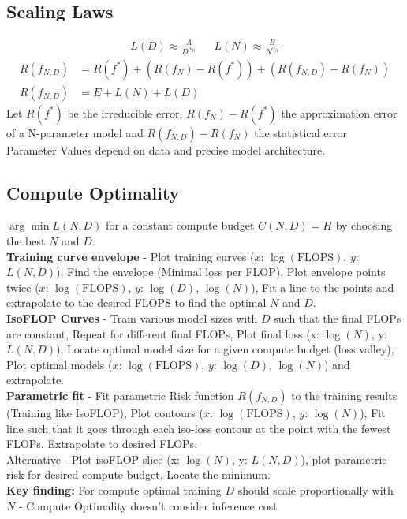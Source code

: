 \begin{multicols}{2}
    \section{Scaling Laws}
    \begin{mdframed}[style=eqbox]
        \begin{align*}
            L(D) \approx \frac{A}{D^{\alpha_D}} && L(N) \approx \frac{B}{N^{\alpha_N}}
        \end{align*}\vspace{-2em}
        \begin{align*}
            R(f_{N,D}) &= R(f^*) + (R(f_N) - R(f^*)) + (R(f_{N,D}) - R(f_N))\\
            R(f_{N,D}) &= E + L(N) + L(D)
        \end{align*}
        {\small
        Let $R(f^*)$ be the irreducible error, $R(f_N) - R(f^*)$ the approximation error of a N-parameter model and $R(f_{N,D}) - R(f_N)$ the statistical error\\
        Parameter Values depend on data and precise model architecture.
        }
        \subsection{Compute Optimality}
        $\arg\min L(N, D)$ for a constant compute budget $C(N, D) = H$ by choosing the best $N$ and $D$.\\
        \textbf{Training curve envelope} - Plot training curves ($x$: $\log(\mathrm{FLOPS})$, $y$: $L(N,D)$), Find the envelope (Minimal loss per FLOP), Plot envelope points twice ($x$: $\log(\mathrm{FLOPS})$, $y$: $\log(D)$, $\log(N)$), Fit a line to the points and extrapolate to the desired FLOPS to find the optimal $N$ and $D$.\\
        \textbf{IsoFLOP Curves} - Train various model sizes with $D$ such that the final FLOPs are constant, Repeat for different final FLOPs, Plot final loss (x: $\log(N)$, y: $L(N, D)$), Locate optimal model size for a given compute budget (loss valley), Plot optimal models ($x$: $\log(\mathrm{FLOPS})$, $y$: $\log(D)$, $\log(N)$) and extrapolate.\\
        \textbf{Parametric fit} - Fit parametric Risk function $R(f_{N,D})$ to the training results (Training like IsoFLOP), Plot contours ($x$: $\log(\mathrm{FLOPS})$, $y$: $\log(N)$), Fit line such that it goes through each iso-loss contour at the point with the fewest FLOPs. Extrapolate to desired FLOPs.\\
        Alternative - Plot isoFLOP slice (x: $\log(N)$, y: $L(N, D)$), plot parametric risk for desired compute budget, Locate the minimum.\\[0.5em]
        \textbf{Key finding:} For compute optimal training $D$ should scale proportionally with $N$ - Compute Optimality doesn't consider inference cost
    \end{mdframed}



\end{multicols}

